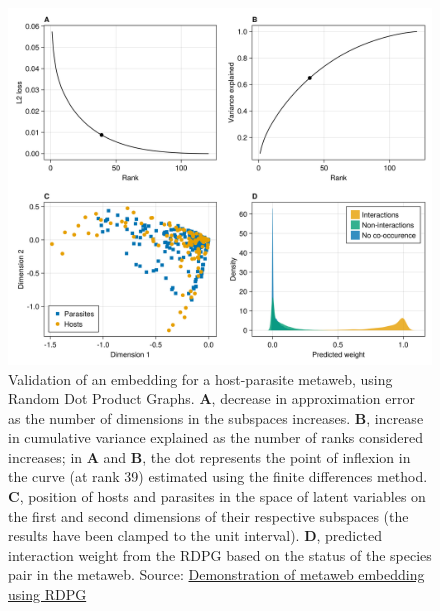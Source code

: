 \documentclass[
  letterpaper,
  DIV=11,
  numbers=noendperiod]{scrartcl}
\begin{document}
\begin{figure}[H]

{\centering \includegraphics{index_files/figure-latex/fig-illustration-1-output-1.png}

}

\caption{\label{fig-illustration-1}Validation of an embedding for a
host-parasite metaweb, using Random Dot Product Graphs. \textbf{A},
decrease in approximation error as the number of dimensions in the
subspaces increases. \textbf{B}, increase in cumulative variance
explained as the number of ranks considered increases; in \textbf{A} and
\textbf{B}, the dot represents the point of inflexion in the curve (at
rank 39) estimated using the finite differences method. \textbf{C},
position of hosts and parasites in the space of latent variables on the
first and second dimensions of their respective subspaces (the results
have been clamped to the unit interval). \textbf{D}, predicted
interaction weight from the RDPG based on the status of the species pair
in the metaweb. Source:
\href{https://PoisotLab.github.io/ms_metaweb_perspectives/notebooks/SupplementaryMaterial-preview.html\#cell-fig-illustration-1}{Demonstration
of metaweb embedding using RDPG}}

\end{figure}
\end{document}
